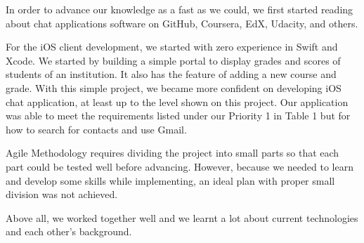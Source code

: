 In order to advance our knowledge as a fast as we could, we first started  reading about chat applications software on GitHub, Coursera, EdX, Udacity, and others.

For the iOS client development, we started with zero experience in Swift and Xcode. We started by building a simple portal to display grades and scores of students of an institution. It also has the feature of adding a new course and grade. With this simple project, we became more confident on developing iOS chat application, at least up to the level shown on this project. Our application was able to meet the requirements listed under our Priority 1 in Table 1 but for how to search for contacts and use Gmail. 
 
Agile Methodology requires dividing the project into small parts so that each part could be tested well before advancing. However, because we needed to learn and develop some skills while implementing, an ideal plan with proper small division was not achieved. 

Above all, we worked together well and we learnt a lot about current technologies and each other's background.

